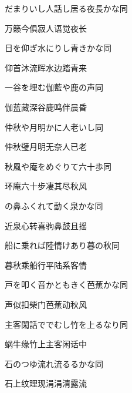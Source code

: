 \begin{haiku}
    {\FH だまりいし人話し居る夜長かな}\hfill{\FH 同}

    {\FK 万籁今俱寂人语觉夜长}
\end{haiku}

\begin{haiku}
    {\FH 日を仰ぎ水にりし青きかな}\hfill{\FH 同}

    {\FK 仰首沐流晖水边踏青来}
\end{haiku}

\begin{haiku}
    {\FH 一谷を埋む伽藍や鹿の声}\hfill{\FH 同}

    {\FK 伽蓝藏深谷鹿鸣伴晨昏}
\end{haiku}

\begin{haiku}
    {\FH 仲秋や月明かに人老いし}\hfill{\FH 同}

    {\FK 仲秋璧月明无奈人已老}
\end{haiku}

\begin{haiku}
    {\FH 秋風や庵をめぐりて六十歩}\hfill{\FH 同}

    {\FK 环庵六十步凄其尽秋风}
\end{haiku}

\begin{haiku}
    {\FH {}の鼻ふくれて動く泉かな}\hfill{\FH 同}

    {\FK 近泉心转喜驹鼻鼓且摇}
\end{haiku}

\begin{haiku}
    {\FH 船に乗れば陸情けあり暮の秋}\hfill{\FH 同}

    {\FK 暮秋乘船行平陆系客情}
\end{haiku}

\begin{haiku}
    {\FH 戸を叩く音かともきく芭蕉かな}\hfill{\FH 同}

    {\FK 声似扣柴门芭蕉动秋风}
\end{haiku}

\begin{haiku}
    {\FH 主客閑話ででむし竹を上るなり}\hfill{\FH 同}

    {\FK 蜗牛缘竹上主客闲话中}
\end{haiku}

\begin{haiku}
    {\FH 石のつゆ流れ流るるかな}\hfill{\FH 同}

    {\FK 石上纹理现涓涓清露流}
\end{haiku}


